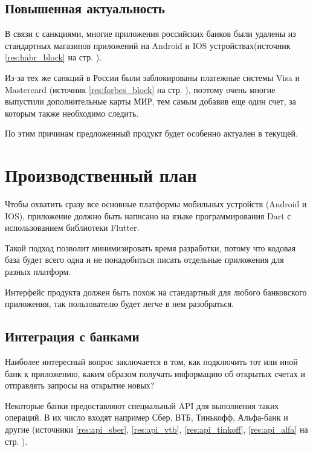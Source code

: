\documentclass[a4paper,12pt]{article}
\begin{document}
    \subsection{Повышенная актуальность}

    В связи с санкциями, многие приложения российских
    банков были удалены из стандартных магазинов приложений на
    Android и IOS устройствах(источник \ref{res:habr_block} на стр.
    \pageref{res:habr_block}).

    Из-за тех же санкций в России были заблокированы платежные
    системы Visa и Mastercard (источник \ref{res:forbes_block} на стр. \pageref{res:forbes_block}),
    поэтому очень многие выпустили дополнительные карты МИР, тем самым
    добавив еще один счет, за которым также необходимо следить.

    По этим причинам предложенный продукт будет особенно актуален в текущей.

    \section{Производственный план}

    Чтобы охватить сразу все основные платформы мобильных
    устройств (Android и IOS), приложение должно быть написано 
    на языке программирования Dart с использованием библиотеки Flutter.

    Такой подход позволит минимизировать время разработки,
    потому что кодовая база будет всего одна и не понадобиться
    писать отдельные приложения для разных платформ.

    Интерфейс продукта должен быть похож на стандартный для
    любого банковского приложения, так пользователю будет легче
    в нем разобраться.

    \subsection{Интеграция с банками}

    Наиболее интересный вопрос заключается в том, как подключить
    тот или иной банк к приложению, каким образом получать информацию
    об открытых счетах и отправлять запросы на открытие новых?

    Некоторые банки предоставляют специальный API для выполнения
    таких операций. В их число входят например Сбер, ВТБ,
    Тинькофф, Альфа-банк и другие (источники \ref{res:api_sber},
    \ref{res:api_vtb}, \ref{res:api_tinkoff}, \ref{res:api_alfa} на
    стр. \pageref{res:api_alfa}).
\end{document}
